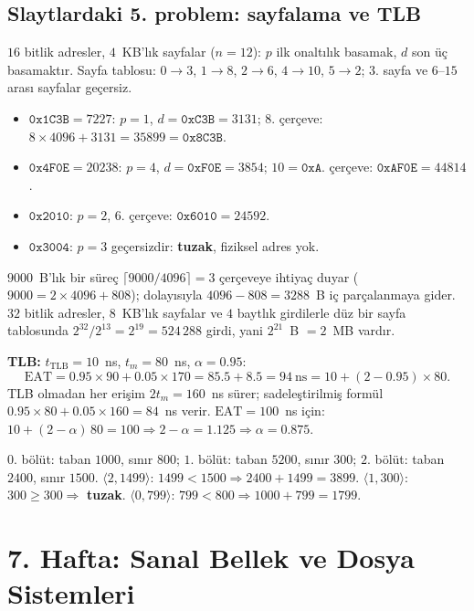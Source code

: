 \documentclass[11pt,a4paper]{article}
\begin{document}
\subsection{Slaytlardaki 5. problem: sayfalama ve TLB}
$16$ bitlik adresler, $4$~KB'lık sayfalar ($n = 12$): $p$ ilk onaltılık basamak, $d$ son üç basamaktır. Sayfa tablosu: $0\to3$, $1\to8$, $2\to6$, $4\to10$, $5\to2$; $3$. sayfa ve $6$--$15$ arası sayfalar geçersiz.
\begin{itemize}
  \item $\texttt{0x1C3B} = 7227$: $p = 1$, $d = \texttt{0xC3B} = 3131$; $8$. çerçeve: $8 \times 4096 + 3131 = 35899 = \texttt{0x8C3B}$.
  \item $\texttt{0x4F0E} = 20238$: $p = 4$, $d = \texttt{0xF0E} = 3854$; $10 = \texttt{0xA}$. çerçeve: $\texttt{0xAF0E} = 44814$.
  \item $\texttt{0x2010}$: $p = 2$, $6$. çerçeve: $\texttt{0x6010} = 24592$.
  \item $\texttt{0x3004}$: $p = 3$ geçersizdir: \textbf{tuzak}, fiziksel adres yok.
\end{itemize}
$9000$~B'lık bir süreç $\lceil 9000/4096\rceil = 3$ çerçeveye ihtiyaç duyar ($9000 = 2\times4096 + 808$); dolayısıyla $4096 - 808 = 3288$~B iç parçalanmaya gider. $32$ bitlik adresler, $8$~KB'lık sayfalar ve $4$ baytlık girdilerle düz bir sayfa tablosunda $2^{32}/2^{13} = 2^{19} = 524\,288$ girdi, yani $2^{21}$~B $= 2$~MB vardır.

\textbf{TLB:} $t_{\text{TLB}} = 10$~ns, $t_m = 80$~ns, $\alpha = 0.95$:
\[
\text{EAT} = 0.95 \times 90 + 0.05 \times 170 = 85.5 + 8.5 = 94\ \text{ns} = 10 + (2 - 0.95)\times 80 .
\]
TLB olmadan her erişim $2t_m = 160$~ns sürer; sadeleştirilmiş formül $0.95\times80 + 0.05\times160 = 84$~ns verir. $\text{EAT} = 100$~ns için: $10 + (2-\alpha)\,80 = 100 \Rightarrow 2 - \alpha = 1.125 \Rightarrow \alpha = 0.875$.

\begin{example}
$0$. bölüt: taban $1000$, sınır $800$; $1$. bölüt: taban $5200$, sınır $300$; $2$. bölüt: taban $2400$, sınır $1500$.
$\langle 2, 1499\rangle$: $1499 < 1500 \Rightarrow 2400 + 1499 = 3899$.
$\langle 1, 300\rangle$: $300 \ge 300 \Rightarrow$ \textbf{tuzak}.
$\langle 0, 799\rangle$: $799 < 800 \Rightarrow 1000 + 799 = 1799$.
\end{example}

\section{7. Hafta: Sanal Bellek ve Dosya Sistemleri}
\label{sec:w7}
\end{document}
